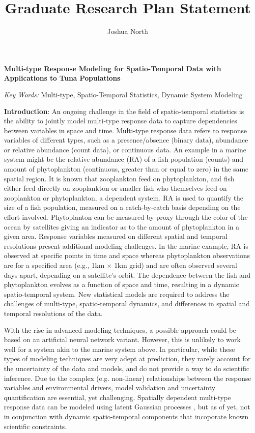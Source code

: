 \documentclass[12pt]{article}
\title{Graduate Research Plan Statement}
\author{Joshua North}
\makeatletter
\renewcommand{\maketitle}{\bgroup\setlength{\parindent}{0pt}
\begin{flushleft}
    \@title

    \@author
    
    \@date
\end{flushleft}\egroup
}
\makeatother
\begin{document}


\begin{center}
    \textbf{Multi-type Response Modeling for Spatio-Temporal Data with Applications to Tuna Populations}
\end{center}

\noindent \textit{Key Words:} Multi-type, Spatio-Temporal Statistics, Dynamic System Modeling

\vspace{2mm}


\noindent \textbf{Introduction}: An ongoing challenge in the field of spatio-temporal statistics is the ability to jointly model multi-type response data to capture dependencies between variables in space and time. Multi-type response data refers to response variables of different types, such as a presence/absence (binary data), abundance or relative abundance (count data), or continuous data. An example in a marine system might be the relative abundance (RA) of a fish population (counts) and amount of phytoplankton (continuous, greater than or equal to zero) in the same spatial region. It is known that zooplankton feed on phytoplankton, and fish either feed directly on zooplankton or smaller fish who themselves feed on zooplankton or phytoplankton, a dependent system. RA is used to quantify the size of a fish population, measured on a catch-by-catch basis depending on the effort involved. Phytoplanton can be measured by proxy through the color of the ocean by satellites giving an indicator as to the amount of phytoplankton in a given area. Response variables measured on different spatial and temporal resolutions present additional modeling challenges. In the marine example, RA is observed at specific points in time and space whereas phytoplankton observations are for a specified area (e.g., 1km $\times$ 1km grid) and are often observed several days apart, depending on a satellite’s orbit. The dependence between the fish and phytoplankton evolves as a function of space and time, resulting in a dynamic spatio-temporal system. New statistical models are required to address the challenges of multi-type, spatio-temporal dynamics, and differences in spatial and temporal resolutions of the data.


With the rise in advanced modeling techniques, a possible approach could be based on an artificial neural network variant. However, this is unlikely to work well for a system akin to the marine system above. In particular, while these types of modeling techniques are very adept at prediction, they rarely account for the uncertainty of the data and models, and do not provide a way to do scientific inference. Due to the complex (e.g. non-linear) relationships between the response variables and environmental drivers, model validation and uncertainty quantification are essential, yet challenging. Spatially dependent multi-type response data can be modeled using latent Gaussian processes \citep{schliep}, but as of yet, not in conjunction with dynamic spatio-temporal components that incoporate known scientific constraints.
\end{document}
